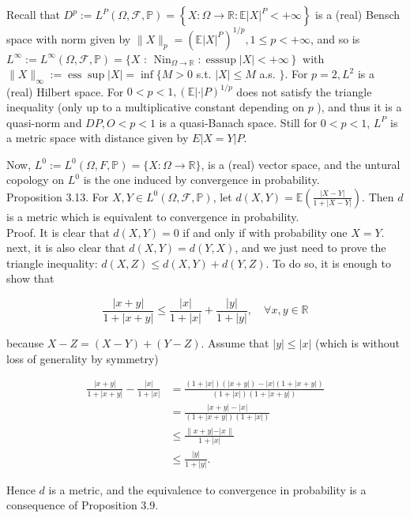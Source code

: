 \documentclass{amsbook}
\theoremstyle{plain}%
\theoremstyle{definition}
\theoremstyle{remark}
\begin{document}
      Recall that $D^{p}:=L^{P}(\Omega, \mathcal{F}, \mathbb{P})=\left\{X: \Omega \rightarrow \mathbb{R}: \mathbb{E}|X|^{P}<+\infty\right\}$ is a (real) Bensch space with norm given by $\|X\|_{p}=\left(\mathbb{E}|X|^{P}\right)^{1 / p}, 1 \leq p<+\infty$, and so is $L^{\infty}:=L^{\infty}(\Omega, \mathcal{F}, \mathbb{P})=\{X$ : $\left.\operatorname{Nin}_{\Omega \rightarrow \mathbb{R}}: \operatorname{esssup}|X|<+\infty\right\}$ with $\|X\|_{\infty}:=\operatorname{ess} \sup |X|=\inf \{M>0$ s.t. $|X| \leq M$ a.s. $\}$. For $p=2, L^{2}$ is a (real) Hilbert space. For $0<p<1,(\mathbb{E}|\cdot| P)^{1 / p}$ does not satisfy the triangle inequality (only up to a multiplicative constant depending on $p$ ), and thus it is a quasi-norm and $D P, O<p<1$ is a quasi-Banach space. Still for $0<p<1$, $L^{P}$ is a metric space with distance given by $E|X=Y| P$.

      Now, $L^{0}:=L^{0}(\Omega, F, \mathbb{P})=\{X: \Omega \rightarrow \mathbb{R}\}$, is a (real) vector space, and the untural copology on $L^{0}$ is the one induced by convergence in probability.\\
      Proposition 3.13. For $X, Y \in L^{0}(\Omega, \mathcal{F}, \mathbb{P})$, let $d(X, Y)=\mathbb{E}\left(\frac{|X-Y|}{1+|X-Y|}\right)$. Then $d$ is a metric which is equivalent to convergence in probability.\\
      Proof. It is clear that $d(X, Y)=0$ if and only if with probability one $X=Y$. next, it is also clear that $d(X, Y)=d(Y, X)$, and we just need to prove the triangle inequality: $d(X, Z) \leq d(X, Y)+d(Y, Z)$. To do so, it is enough to show that

      $$
      \frac{|x+y|}{1+|x+y|} \leq \frac{|x|}{1+|x|}+\frac{|y|}{1+|y|}, \quad \forall x, y \in \mathbb{R}
      $$

      because $X-Z=(X-Y)+(Y-Z)$. Assume that $|y| \leq|x|$ (which is without loss of generality by symmetry)

      $$
      \begin{aligned}
        \frac{|x+y|}{1+|x+y|}-\frac{|x|}{1+|x|} & =\frac{(1+|x|)(|x+y|)-|x|(1+|x+y|)}{(1+|x|)(1+|x+y|)} \\
        & =\frac{|x+y|-|x|}{(1+|x+y|)(1+|x|)}                   \\
        & \leq \frac{\|x+y|-| x\|}{1+|x|}                       \\
        & \leq \frac{|y|}{1+|y|} .
      \end{aligned}
      $$

      Hence $d$ is a metric, and the equivalence to convergence in probability is a consequence of Proposition 3.9.
\end{document}
